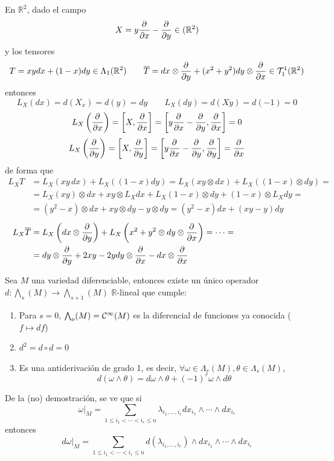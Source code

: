 \begin{ejem}
    En $\mathbb R^2$, dado el campo 
    $$X=y \dfrac{\partial^{} }{\partial x}-\dfrac{\partial^{} }{\partial y} \in \mathfrak(\mathbb R^2)$$
    y los tensores
    $$T=xydx+(1-x)dy \in \Lambda_1(\mathbb R^2) \qquad \overline{T}=dx\otimes \dfrac{\partial^{} }{\partial y} + (x^2+y^2)dy \otimes \dfrac{\partial^{} }{\partial x} \in \mathcal{T}_1^1(\mathbb R^2)$$
    entonces
    $$L_X(dx)=d(X_x)=d(y)=dy \qquad L_X(dy)=d(Xy)=d(-1)=0$$
    $$L_X\left(\dfrac{\partial^{} }{\partial x}\right) = \left[X,\dfrac{\partial^{} }{\partial x}\right] = \left[y\dfrac{\partial^{} }{\partial x}-\dfrac{\partial^{} }{\partial y},\dfrac{\partial^{} }{\partial x}\right] = 0 $$
    $$L_X\left(\dfrac{\partial^{} }{\partial y}\right)=\left[X,\dfrac{\partial^{} }{\partial y}\right]=\left[y\dfrac{\partial^{} }{\partial x}-\dfrac{\partial^{} }{\partial y},\dfrac{\partial^{} }{\partial y}\right]=\dfrac{\partial^{} }{\partial x}$$de forma que
    \[\begin{split} L_XT & =L_X(xy \, dx) + L_X((1-x)dy)=L_X(xy\otimes dx)+ L_X((1-x)\otimes dy) = \\ & = L_X(xy)\otimes dx + xy \otimes L_Xdx + L_X(1-x) \otimes dy + (1-x)\otimes L_X dy = \\ & = (y^2-x) \otimes dx + xy \otimes dy - y\otimes dy =(y^2-x) dx + (xy-y) dy \end{split}\]
    \[\begin{split}
        L_X\overline{T} & = L_X\left(dx\otimes \pd{}{y} \right) + L_X\left(x^2+y^2\otimes dy \otimes \pd{}{x}\right) = \cdots = \hspace{28mm} \\ & = dy \otimes \pd{}{y}+2xy-2y dy\otimes \pd{}{x}-dx\otimes \pd{}{x}
    \end{split}\]
\end{ejem}\begin{teo}
    Sea $M$ una variedad diferenciable, entonces existe un \'unico operador \\ $d:\bigwedge_s(M) \longrightarrow \bigwedge_{s+1}(M)$ $\mathbb R$-lineal que cumple: \vspace{-3mm}
    \begin{enumerate}
        \item Para $s=0$, $\bigwedge_o(M) = \mathcal{C}^{\infty}(M)$ es la diferencial de funciones ya conocida ($f\longmapsto df$)
        \item $d^2=d\circ d=0$
        \item Es una antiderivaci\'on de grado 1, es decir, $\forall \omega \in \Lambda_r(M), \theta \in \Lambda_s(M)$,
        $$d(\omega \wedge \theta)=d\omega \wedge \theta + (-1)^r \omega \wedge d\theta$$
    \end{enumerate}
\end{teo}
\begin{obs}
    De la (no) demostraci\'on, se ve que si
    $$\omega|_M = \sum_{1\leq i_1 < \cdots < i_r \leq n} \lambda_{i_1,\ldots,i_r} dx_{i_1}\wedge \cdots \wedge dx_{i_r}$$
    entonces
    $$d\omega|_M = \sum_{1\leq i_1 < \cdots < i_r \leq n} d(\lambda_{i_1,\ldots,i_r}) \wedge dx_{i_1}\wedge \cdots \wedge dx_{i_r}$$
\end{obs}

